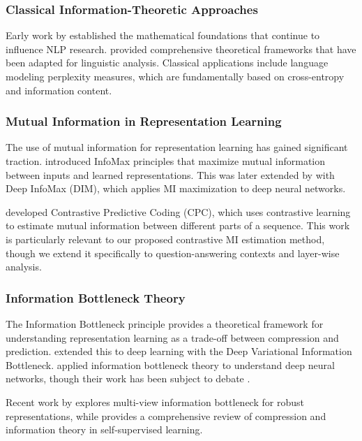 \subsubsection{Classical Information-Theoretic Approaches}
Early work by \citet{shannon1948mathematical} established the mathematical foundations that continue to influence NLP research. \citet{cover1999elements} provided comprehensive theoretical frameworks that have been adapted for linguistic analysis. Classical applications include language modeling perplexity measures, which are fundamentally based on cross-entropy and information content.

\subsubsection{Mutual Information in Representation Learning}
The use of mutual information for representation learning has gained significant traction. \citet{linsker1988self} introduced InfoMax principles that maximize mutual information between inputs and learned representations. This was later extended by \citet{hjelm2019learning} with Deep InfoMax (DIM), which applies MI maximization to deep neural networks.

\citet{oord2018representation} developed Contrastive Predictive Coding (CPC), which uses contrastive learning to estimate mutual information between different parts of a sequence. This work is particularly relevant to our proposed contrastive MI estimation method, though we extend it specifically to question-answering contexts and layer-wise analysis.

\subsubsection{Information Bottleneck Theory}
The Information Bottleneck principle \citep{tishby2000information} provides a theoretical framework for understanding representation learning as a trade-off between compression and prediction. \citet{alemi2017deep} extended this to deep learning with the Deep Variational Information Bottleneck. \citet{shwartz2017opening} applied information bottleneck theory to understand deep neural networks, though their work has been subject to debate \citep{saxe2019information}.

Recent work by \citet{federici2020learning} explores multi-view information bottleneck for robust representations, while \citet{shwartz2023compress} provides a comprehensive review of compression and information theory in self-supervised learning.

